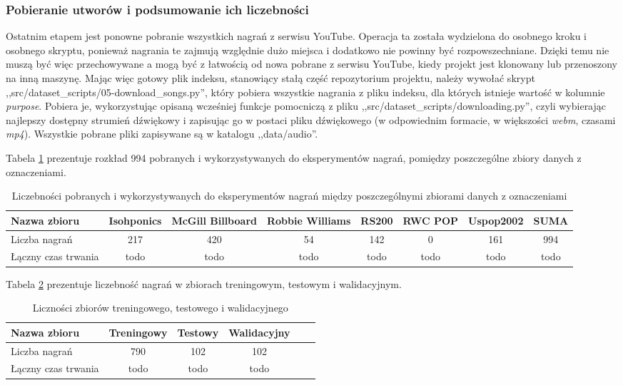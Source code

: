 \subsubsection{Pobieranie utworów i podsumowanie ich liczebności}
Ostatnim etapem jest ponowne pobranie wszystkich nagrań z serwisu YouTube. Operacja ta została
wydzielona do osobnego kroku i osobnego skryptu, ponieważ nagrania te zajmują względnie dużo miejsca
i dodatkowo nie powinny być rozpowszechniane. Dzięki temu nie muszą być więc przechowywane a mogą
być z łatwością od nowa pobrane z serwisu YouTube, kiedy projekt jest klonowany lub przenoszony na
inną maszynę. Mając więc gotowy plik indeksu, stanowiący stałą część repozytorium projektu, należy
wywołać skrypt ,,src/dataset\_scripts/05-download\_songs.py'', który pobiera wszystkie nagrania z
pliku indeksu, dla których istnieje wartość w kolumnie \emph{purpose}. Pobiera je, wykorzystując
opisaną wcześniej funkcje pomocniczą z pliku ,,src/dataset\_scripts/downloading.py'', czyli
wybierając najlepszy dostępny strumień dźwiękowy i zapisując go w postaci pliku dźwiękowego (w
odpowiednim formacie, w większości \emph{webm}, czasami \emph{mp4}). Wszystkie pobrane pliki
zapisywane są w katalogu ,,data/audio''.

Tabela \ref{tab:datasets2} prezentuje rozkład 994 pobranych i wykorzystywanych do eksperymentów
nagrań, pomiędzy poszczególne zbiory danych z oznaczeniami.

\begin{table}
    \caption{Liczebności pobranych i wykorzystywanych do eksperymentów nagrań między poszczególnymi zbiorami danych z oznaczeniami}
    \label{tab:datasets2}
    \begin{tabular}{|l|c|c|c|c|c|c|c|} \hline
        Nazwa zbioru & Isohponics & McGill Billboard & Robbie Williams & RS200 & RWC POP & Uspop2002 & SUMA \\ \hline
        Liczba nagrań  & 217      & 420              & 54              & 142   & 0       & 161       & 994  \\ \hline
        Łączny czas trwania & todo& todo             & todo            & todo  & todo    & todo      & todo \\ \hline
    \end{tabular}
\end{table}

Tabela \ref{tab:datasets3} prezentuje liczebność nagrań w zbiorach treningowym, testowym i
walidacyjnym.

\begin{table}
    \caption{Liczności zbiorów treningowego, testowego i walidacyjnego}
    \label{tab:datasets3}
    \begin{tabular}{|l|c|c|c|c|c|} \hline
        Nazwa zbioru & Treningowy & Testowy & Walidacyjny \\ \hline
        Liczba nagrań  & 790 & 102 & 102 \\ \hline
        Łączny czas trwania & todo & todo & todo \\ \hline
    \end{tabular}
\end{table}


